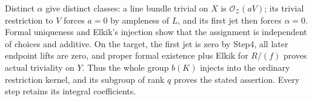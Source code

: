 Distinct $\alpha$ give distinct classes: a line bundle trivial on
$X$ is $\mathcal O_{\mathcal Z}(aV)$; its trivial restriction to $V$
forces $a=0$ by ampleness of $L$, and its first jet then forces
$\alpha=0$. Formal uniqueness and Elkik's injection show that the
assignment is independent of choices and additive. On the target,
the first jet is zero by Step4, all later endpoint lifts are zero,
and proper formal existence plus Elkik for $R/(f)$ proves actual
triviality on $Y$. Thus the whole group $b(K)$ injects into the
ordinary restriction kernel, and its subgroup of rank $q$ proves
the stated assertion. Every step retains its integral coefficients.
